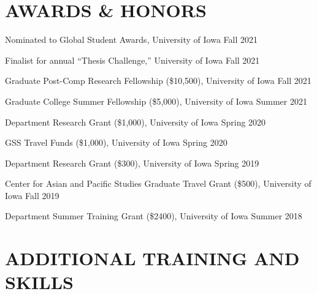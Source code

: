 \documentclass[10.5pt,]{article}
\providecommand{\tightlist}{%
	\setlength{\itemsep}{0pt}\setlength{\parskip}{0pt}}
\renewenvironment{itemize}{
	\begin{list}{}{
			\setlength{\leftmargin}{1.5em}
		}
	}{
	\end{list}
}
\begin{document}
\section{AWARDS \& HONORS}\label{awards-honors}

\begin{itemize}
\tightlist
\item
  Nominated to Global Student Awards, University of Iowa \hfill Fall
  2021
\item
  Finalist for annual ``Thesis Challenge,'' University of Iowa
  \hfill Fall 2021
\item
  Graduate Post-Comp Research Fellowship (\$10,500), University of Iowa
  \hfill Fall 2021
\item
  Graduate College Summer Fellowship (\$5,000), University of Iowa
  \hfill Summer 2021
\item
  Department Research Grant (\$1,000), University of Iowa \hfill Spring
  2020
\item
  GSS Travel Funds (\$1,000), University of Iowa \hfill Spring 2020
\item
  Department Research Grant (\$300), University of Iowa \hfill Spring
  2019
\item
  Center for Asian and Pacific Studies Graduate Travel Grant (\$500),
  University of Iowa \hfill Fall 2019
\item
  Department Summer Training Grant (\$2400), University of Iowa
  \hfill Summer 2018
\end{itemize}

\section{ADDITIONAL TRAINING AND
SKILLS}\label{additional-training-and-skills}
\end{document}
